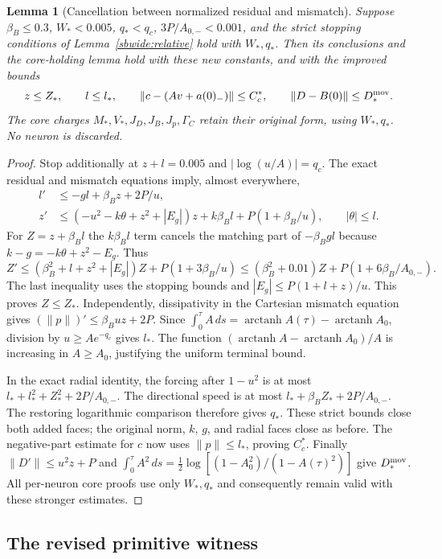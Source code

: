 \documentclass[11pt]{article}
\newtheorem{lemma}[theorem]{Lemma}
\theoremstyle{remark}
\begin{document}
\begin{lemma}[Cancellation between normalized residual and mismatch]
\label{sbsharp:weighted}
Suppose $\beta_B\le0.3$, $W_*<0.005$, $q_*<q_c$,
$3P/A_{0,-}<0.001$, and the strict stopping conditions of
Lemma~\ref{sbwide:relative} hold with $W_*,q_*$.
Then its conclusions and the core-holding lemma hold with these new
constants, and with the improved bounds
\[
 z\le Z_*,\qquad l\le l_*,\qquad
 \|c-(Av+a(0)_-)\|\le C_c^*,\qquad
 \|D-B(0)\|\le D_*^{\rm mov}.
\]
The core charges $M_*,V_*,J_D,J_B,J_p,\Gamma_C$ retain their original
form, using $W_*,q_*$. No neuron is discarded.
\end{lemma}
\begin{proof}
Stop additionally at $z+l=0.005$ and $|\log(u/A)|=q_c$.
The exact residual and mismatch equations imply, almost everywhere,
\begin{align*}
 l'&\le-gl+\beta_Bz+2P/u,\\
 z'&\le(-u^2-k\theta+z^2+|E_g|)z
                    +k\beta_Bl+P(1+\beta_B/u),
 \qquad |\theta|\le l.
\end{align*}
For $Z=z+\beta_Bl$ the $k\beta_Bl$ term cancels the matching part of
$-\beta_Bgl$ because $k-g=-k\theta+z^2-E_g$. Thus
\[
 Z'\le(\beta_B^2+l+z^2+|E_g|)Z+P(1+3\beta_B/u)
 \le(\beta_B^2+0.01)Z+P(1+6\beta_B/A_{0,-}).
\]
The last inequality uses the stopping bounds and
$|E_g|\le P(1+l+z)/u$. This proves $Z\le Z_*$.
Independently, dissipativity in the Cartesian mismatch equation gives
$(\|p\|)'\le\beta_Buz+2P$. Since
$\int_0^\tau A\,ds=\operatorname{arctanh}A(\tau)
-\operatorname{arctanh}A_0$, division by $u\ge Ae^{-q_c}$ gives $l_*$.
The function $(\operatorname{arctanh}A-\operatorname{arctanh}A_0)/A$
is increasing in $A\ge A_0$, justifying the uniform terminal bound.

In the exact radial identity, the forcing after $1-u^2$ is at most
$l_*+l_*^2+Z_*^2+2P/A_{0,-}$. The directional speed is at most
$l_*+\beta_BZ_*+2P/A_{0,-}$. The restoring logarithmic comparison
therefore gives $q_*$. These strict bounds close both added faces;
the original norm, $k$, $g$, and radial faces close as before.
The negative-part estimate for $c$ now uses $\|p\|\le l_*$, proving
$C_c^*$. Finally $\|D'\|\le u^2z+P$ and
$\int_0^\tau A^2\,ds=\frac12\log[(1-A_0^2)/(1-A(\tau)^2)]$
give $D_*^{\rm mov}$. All per-neuron core proofs use only $W_*,q_*$
and consequently remain valid with these stronger estimates.
\end{proof}

\subsection{The revised primitive witness}
\end{document}
